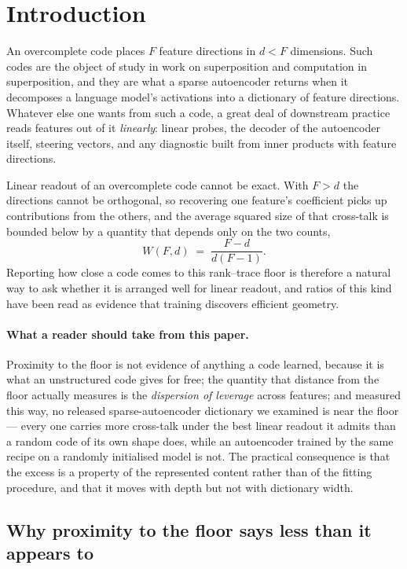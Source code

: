 \section{Introduction}
\label{sec:intro}

An overcomplete code places $F$ feature directions in $d<F$ dimensions. Such codes are the object of
study in work on superposition and computation in superposition, and they are what a sparse
autoencoder returns when it decomposes a language model's activations into a dictionary of feature
directions. Whatever else one wants from such a code, a great deal of downstream practice reads
features out of it \emph{linearly}: linear probes, the decoder of the autoencoder itself, steering
vectors, and any diagnostic built from inner products with feature directions.

Linear readout of an overcomplete code cannot be exact. With $F>d$ the directions cannot be
orthogonal, so recovering one feature's coefficient picks up contributions from the others, and the
average squared size of that cross-talk is bounded below by a quantity that depends only on the two
counts,
\[
  W(F,d)\;=\;\frac{F-d}{d(F-1)} .
\]
Reporting how close a code comes to this rank--trace floor is therefore a natural way to ask whether
it is arranged well for linear readout, and ratios of this kind have been read as evidence that
training discovers efficient geometry.

\paragraph{What a reader should take from this paper.} Proximity to the floor is not evidence of
anything a code learned, because it is what an unstructured code gives for free; the quantity that
distance from the floor actually measures is the \emph{dispersion of leverage} across features; and
measured this way, no released sparse-autoencoder dictionary we examined is near the floor --- every
one carries more cross-talk under the best linear readout it admits than a random code of its own
shape does, while an
autoencoder trained by the same recipe on a randomly initialised model is not. The practical
consequence is that the excess is a property of the represented content rather than of the fitting
procedure, and that it moves with depth but not with dictionary width.

\subsection{Why proximity to the floor says less than it appears to}

